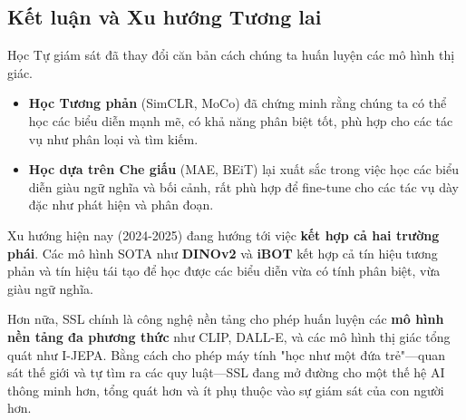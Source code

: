 \subsection{Kết luận và Xu hướng Tương lai}
\label{subsec:ssl_conclusion_trends}
Học Tự giám sát đã thay đổi căn bản cách chúng ta huấn luyện các mô hình thị giác.
\begin{itemize}
	\item \textbf{Học Tương phản} (SimCLR, MoCo) đã chứng minh rằng chúng ta có thể học các biểu diễn mạnh mẽ, có khả năng phân biệt tốt, phù hợp cho các tác vụ như phân loại và tìm kiếm.
	\item \textbf{Học dựa trên Che giấu} (MAE, BEiT) lại xuất sắc trong việc học các biểu diễn giàu ngữ nghĩa và bối cảnh, rất phù hợp để fine-tune cho các tác vụ dày đặc như phát hiện và phân đoạn.
\end{itemize}
Xu hướng hiện nay (2024-2025) đang hướng tới việc \textbf{kết hợp cả hai trường phái}. Các mô hình SOTA như \textbf{DINOv2} và \textbf{iBOT} kết hợp cả tín hiệu tương phản và tín hiệu tái tạo để học được các biểu diễn vừa có tính phân biệt, vừa giàu ngữ nghĩa.

Hơn nữa, SSL chính là công nghệ nền tảng cho phép huấn luyện các \textbf{mô hình nền tảng đa phương thức} như CLIP, DALL-E, và các mô hình thị giác tổng quát như I-JEPA. Bằng cách cho phép máy tính "học như một đứa trẻ"—quan sát thế giới và tự tìm ra các quy luật—SSL đang mở đường cho một thế hệ AI thông minh hơn, tổng quát hơn và ít phụ thuộc vào sự giám sát của con người hơn.

